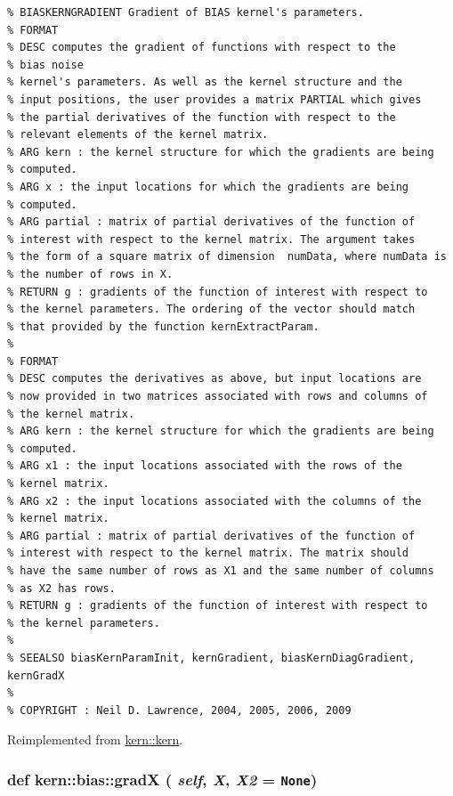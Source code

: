 \footnotesize\begin{verbatim}% BIASKERNGRADIENT Gradient of BIAS kernel's parameters.
% FORMAT
% DESC computes the gradient of functions with respect to the
% bias noise
% kernel's parameters. As well as the kernel structure and the
% input positions, the user provides a matrix PARTIAL which gives
% the partial derivatives of the function with respect to the
% relevant elements of the kernel matrix. 
% ARG kern : the kernel structure for which the gradients are being
% computed.
% ARG x : the input locations for which the gradients are being
% computed. 
% ARG partial : matrix of partial derivatives of the function of
% interest with respect to the kernel matrix. The argument takes
% the form of a square matrix of dimension  numData, where numData is
% the number of rows in X.
% RETURN g : gradients of the function of interest with respect to
% the kernel parameters. The ordering of the vector should match
% that provided by the function kernExtractParam.
%
% FORMAT
% DESC computes the derivatives as above, but input locations are
% now provided in two matrices associated with rows and columns of
% the kernel matrix. 
% ARG kern : the kernel structure for which the gradients are being
% computed.
% ARG x1 : the input locations associated with the rows of the
% kernel matrix.
% ARG x2 : the input locations associated with the columns of the
% kernel matrix.
% ARG partial : matrix of partial derivatives of the function of
% interest with respect to the kernel matrix. The matrix should
% have the same number of rows as X1 and the same number of columns
% as X2 has rows.
% RETURN g : gradients of the function of interest with respect to
% the kernel parameters.
%
% SEEALSO biasKernParamInit, kernGradient, biasKernDiagGradient, kernGradX
%
% COPYRIGHT : Neil D. Lawrence, 2004, 2005, 2006, 2009

\end{verbatim}
\normalsize
 

Reimplemented from \hyperlink{classkern_1_1kern}{kern::kern}.\hypertarget{classkern_1_1bias_f27d4ed48a7df56e86609c27dd1ab430}{
\subsubsection[{gradX}]{\setlength{\rightskip}{0pt plus 5cm}def kern::bias::gradX ( {\em self}, \/   {\em X}, \/   {\em X2} = {\tt None})}}
\label{classkern_1_1bias_f27d4ed48a7df56e86609c27dd1ab430}





